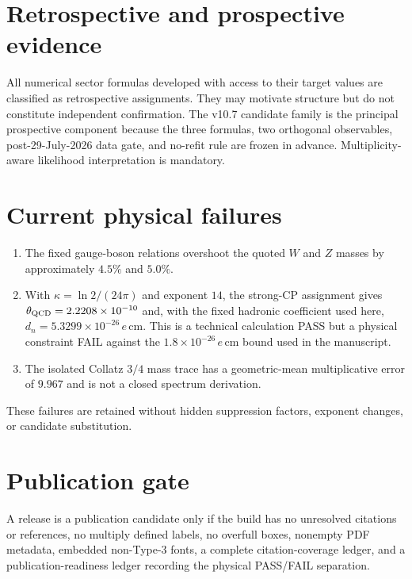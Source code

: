 \section{Retrospective and prospective evidence}
All numerical sector formulas developed with access to their target values are
classified as retrospective assignments.  They may motivate structure but do
not constitute independent confirmation.  The v10.7 candidate family is the
principal prospective component because the three formulas, two orthogonal
observables, post-29-July-2026 data gate, and no-refit rule are frozen in advance.
Multiplicity-aware likelihood interpretation is mandatory.

\section{Current physical failures}
\begin{enumerate}
  \item The fixed gauge-boson relations overshoot the quoted $W$ and $Z$ masses
  by approximately $4.5\%$ and $5.0\%$.
  \item With $\kappa=\ln2/(24\pi)$ and exponent $14$, the strong-CP assignment
  gives $\theta_{\rm QCD}=2.2208\times10^{-10}$ and, with the fixed hadronic
  coefficient used here, $d_n=5.3299\times10^{-26}\,e\,\mathrm{cm}$.  This is a
  technical calculation PASS but a physical constraint FAIL against the
  $1.8\times10^{-26}\,e\,\mathrm{cm}$ bound used in the manuscript.
  \item The isolated Collatz $3/4$ mass trace has a geometric-mean multiplicative
  error of $9.967$ and is not a closed spectrum derivation.
\end{enumerate}

These failures are retained without hidden suppression factors, exponent changes,
or candidate substitution.

\section{Publication gate}
A release is a publication candidate only if the build has no unresolved
citations or references, no multiply defined labels, no overfull boxes, nonempty
PDF metadata, embedded non-Type-3 fonts, a complete citation-coverage ledger, and
a publication-readiness ledger recording the physical PASS/FAIL separation.

